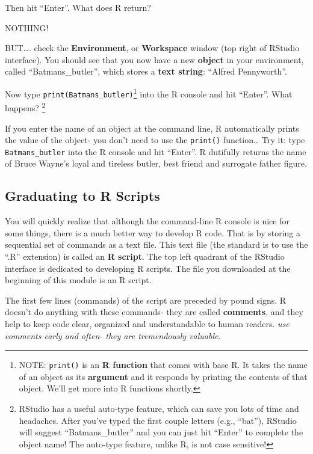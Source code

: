 \documentclass[]{article}
\let\rmarkdownfootnote\footnote%
\def\footnote{\protect\rmarkdownfootnote}
\begin{document}
Then hit ``Enter''. What does R return?

NOTHING!

BUT\ldots{}. check the \textbf{Environment}, or \textbf{Workspace}
window (top right of RStudio interface). You should see that you now
have a new \textbf{object} in your environment, called
``Batmans\_butler'', which stores a \textbf{text string}: ``Alfred
Pennyworth''.

Now type \texttt{print(Batmans\_butler)}\footnote{NOTE: \texttt{print()}
  is an \textbf{R function} that comes with base R. It takes the name of
  an object as its \textbf{argument} and it responds by printing the
  contents of that object. We'll get more into R functions shortly.}
into the R console and hit ``Enter''. What happens? \footnote{RStudio
  has a useful auto-type feature, which can save you lots of time and
  headaches. After you've typed the first couple letters (e.g.,
  ``bat''), RStudio will suggest ``Batmans\_butler'' and you can just
  hit ``Enter'' to complete the object name! The auto-type feature,
  unlike R, is not case sensitive!}

If you enter the name of an object at the command line, R automatically
prints the value of the object- you don't need to use the
\texttt{print()} function\ldots{} Try it: type \texttt{Batmans\_butler}
into the R console and hit ``Enter''. R dutifully returns the name of
Bruce Wayne's loyal and tireless butler, best friend and surrogate
father figure.

\subsection{Graduating to R Scripts}\label{graduating-to-r-scripts}

You will quickly realize that although the command-line R console is
nice for some things, there is a much better way to develop R code. That
is by storing a sequential set of commands as a text file. This text
file (the standard is to use the ``.R'' extension) is called an
\textbf{R script}. The top left quadrant of the RStudio interface is
dedicated to developing R scripts. The file you downloaded at the
beginning of this module is an R script.

The first few lines (commands) of the script are preceded by pound
signs. R doesn't do anything with these commands- they are called
\textbf{comments}, and they help to keep code clear, organized and
understandable to human readers. \emph{use comments early and often-
they are tremendously valuable}.
\end{document}
